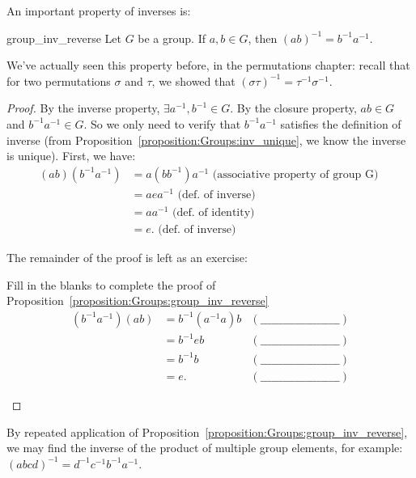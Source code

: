 \noindent
An important property of inverses is:

\begin{prop}{group_inv_reverse}
Let $G$ be a group. If $a, b \in G$, then $(ab)^{-1} = b^{-1}a^{-1}$. 
\end{prop}

\begin{rem}
We've actually seen this property before, in the permutations chapter: recall that for two permutations $\sigma$ and $\tau$, we showed that
$(\sigma \tau)^{-1} = \tau^{-1} \sigma^{-1}.$
\end{rem}

\begin{proof}
By the inverse property, $ \exists a^{-1}, b^{-1} \in G$. By the closure property, $ab \in G$ and $b^{-1}a^{-1} \in G$. So
we only need to verify that $b^{-1}a^{-1}$ satisfies the definition of inverse (from Proposition~\ref{proposition:Groups:inv_unique}, we know the inverse is unique). First, we have:    
\begin{align*}
(ab)(b^{-1}a^{-1}) & = a(bb^{-1})a^{-1}  \text{ (associative property of group G) } \\
 & = aea^{-1}  \text{ (def. of inverse) } \\
 & = aa^{-1}  \text{ (def. of identity) } \\
 & = e.  \text{ (def. of inverse) }
\end{align*}

\noindent
The remainder of the proof is left as an exercise:

\begin{exercise}{42}
Fill in the blanks to complete the proof of Proposition~\ref{proposition:Groups:group_inv_reverse}
\begin{align*}
(b^{-1}a^{-1})(ab) & = b^{-1}(a^{-1}a)b  &(\_\_\_\_\_\_\_\_\_\_\_\_\_\_\_\_\_\_\_\_\_) \\
 & = b^{-1}eb  &(\_\_\_\_\_\_\_\_\_\_\_\_\_\_\_\_\_\_\_\_\_) \\
 & = b^{-1}b  &(\_\_\_\_\_\_\_\_\_\_\_\_\_\_\_\_\_\_\_\_\_) \\
 & = e.  &(\_\_\_\_\_\_\_\_\_\_\_\_\_\_\_\_\_\_\_\_\_)
\end{align*}
\end{exercise}
\end{proof}

By repeated application of Proposition~\ref{proposition:Groups:group_inv_reverse}, we may find the inverse of the product of multiple group elements, for example: $(abcd)^{-1} = d^{-1}c^{-1}b^{-1}a^{-1}$.

